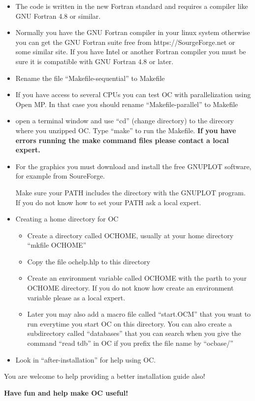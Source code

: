 \documentclass[12pt]{article}
\begin{document}
\begin{itemize}
\item The code is written in the new Fortran standard and requires a
  compiler like GNU Fortran 4.8 or similar.

\item Normally you have the GNU Fortran compiler in your linux system
  otherwise you can get the GNU Fortran suite free from
  https://SourgeForge.net or some similar site.  If you have Intel or
  another Fortran compiler you must be sure it is compatible with GNU
  Fortran 4.8 or later.

\item Rename the file ``Makefile-sequential'' to Makefile

\item If you have access to several CPUs you can test OC with
  parallelization using Open MP.  In that case you should rename
  ``Makefile-parallel'' to Makefile

\item open a terminal window and use ``cd'' (change directory) to the
  direcory where you unzipped OC.  Type ``make'' to run the Makefile.
  {\bf If you have errors running the make command files please
    contact a local expert.}

\item For the graphics you must download and install the free GNUPLOT
  software, for example from SoureForge.

  Make sure your PATH includes the directory with the GNUPLOT program.
  If you do not know how to set your PATH ask a local expert.

\item Creating a home directory for OC
  \begin{itemize}
  \item Create a directory called OCHOME, usually at your home
    directory ``mkfile OCHOME''
    
  \item Copy the file ochelp.hlp to this directory

  \item Create an environment variable called OCHOME with the parth
    to your OCHOME directory.  If you do not know how create an
    environment variable please as a local expert.

  \item Later you may also add a macro file called ``start.OCM''
    that you want to run everytime you start OC on this directory.
    You can also create a subdirectory called ``databases'' that you
    can search when you give the command ``read tdb'' in OC if you
    prefix the file name by ``ocbase/''
  \end{itemize} 

\item Look in ``after-installation'' for help using OC.

\end{itemize}

You are welcome to help providing a better installation guide also!

\bigskip

{\large \bf Have fun and help make OC useful!}
\end{document}
